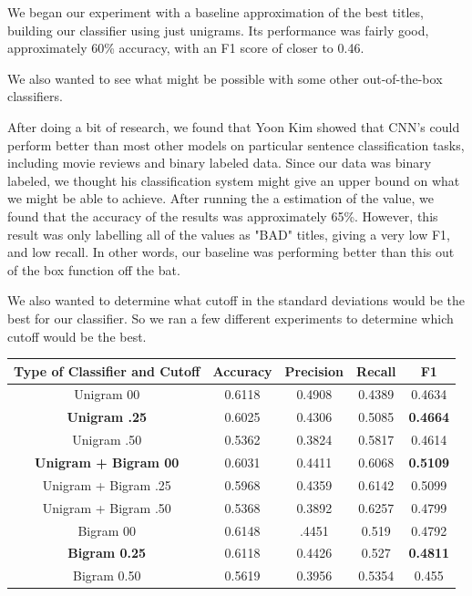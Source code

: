\documentclass[a4paper,12pt]{article}
\begin{document}
We began our experiment with a baseline approximation of the best titles, building our classifier using just unigrams. Its performance was fairly good, approximately 60\% accuracy, with an F1 score of closer to 0.46.

We also wanted to see what might be possible with some other out-of-the-box classifiers.

After doing a bit of research, we found that  Yoon Kim showed that CNN's could perform better than most other models on particular sentence classification tasks, including movie reviews and binary labeled data. Since our data was binary labeled, we thought his classification system might give an upper bound on what we might be able to achieve. After running the a estimation of the value, we found that the accuracy of the results was approximately 65\%. However, this result was only labelling all of the values as "BAD" titles, giving a very low F1, and low recall. In other words, our baseline was performing better than this out of the box function off the bat.

We also wanted to determine what cutoff in the standard deviations would be the best for our classifier. So we ran a few different experiments to determine which cutoff would be the best. 
 
\begin{center}
 \begin{tabular}{|c| c| c| c| c|} 
 \hline
 Type of Classifier and Cutoff & Accuracy & Precision & Recall & F1 \\ [0.5ex] 
 \hline
 Unigram 00 & 0.6118  & 0.4908  &0.4389  & 0.4634\\ 
 \hline
 \textbf{Unigram .25} &  0.6025& 0.4306  & 0.5085  & \textbf{0.4664}\\ 
\hline
 Unigram .50 & 0.5362  & 0.3824  & 0.5817  & 0.4614\\ 
\hline
  \hline
\textbf{ Unigram + Bigram 00}& 0.6031  & 0.4411  & 0.6068  &\textbf{0.5109}\\
 \hline
 Unigram + Bigram .25& 0.5968  & 0.4359  & 0.6142  &0.5099\\
\hline
 Unigram + Bigram .50& 0.5368  & 0.3892  & 0.6257  &0.4799\\
\hline
 \hline
 
Bigram 00 & 0.6148  & .4451  & 0.519  &0.4792\\
\hline
\textbf{Bigram  0.25}& 0.6118  & 0.4426  & 0.527  &\textbf{0.4811}\\
\hline
Bigram 0.50 & 0.5619  & 0.3956  & 0.5354  & 0.455\\
\hline

\end{tabular}
\end{center}
\end{document}
